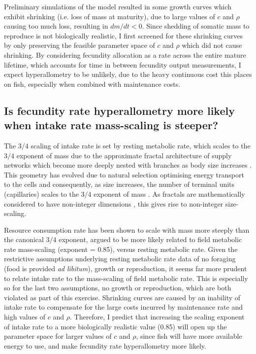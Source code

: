 \documentclass[a4paper]{article} %
\begin{document}
Preliminary simulations of the model resulted in some growth curves which exhibit shrinking (i.e. loss of mass at maturity), due to large values of $c$ and $\rho$ causing too much loss, resulting in $dm/dt < 0$. Since shedding of somatic mass to reproduce is not biologically realistic, I first screened for these shrinking curves by only preserving the feasible parameter space of $c$ and $\rho$ which did not cause shrinking.
By considering fecundity allocation as a rate across the entire mature lifetime, which accounts for time in between fecundity output measurements, I expect hyperallometry to be unlikely, due to the heavy continuous cost this places on fish, especially when combined with maintenance costs.

\subsection{Is fecundity rate hyperallometry more likely when intake rate mass-scaling is steeper?}

The $3/4$ scaling of intake rate is set by resting metabolic rate, which scales to the $3/4$ exponent of mass \autocite{Kleiber1947, peters1983, niklas1994plant} due to the approximate fractal architecture of supply networks which become more deeply nested with branches as body size increases \autocite{West1997}. This geometry has evolved due to natural selection optimising energy transport to the cells and consequently, as size increases, the number of terminal units (capillaries) scales to the $3/4$ exponent of mass \autocite{West1997, West2005}. As fractals are mathematically considered to have non-integer dimensions \autocite{Hausdorff1918, Mandelbrot1982}, this gives rise to non-integer size-scaling. 

Resource consumption rate has been shown to scale with mass more steeply than the canonical $3/4$ exponent, argued to be more likely related to field metabolic rate mass-scaling (exponent = 0.85), versus resting metabolic rate. Given the restrictive assumptions underlying resting metabolic rate data of no foraging (food is provided \textit{ad libitum}), growth or reproduction, it seems far more prudent to relate intake rate to the mass-scaling of field metabolic rate. This is especially so for the last two assumptions, no growth or reproduction, which are both violated as part of this exercise. Shrinking curves are caused by an inability of intake rate to compensate for the large costs incurred by maintenance rate and high values of $c$ and $\rho$. Therefore, I predict that increasing the scaling exponent of intake rate to a more biologically realistic value (0.85) will open up the parameter space for larger values of $c$ and $\rho$, since fish will have more available energy to use, and make fecundity rate hyperallometry more likely.
\end{document}
